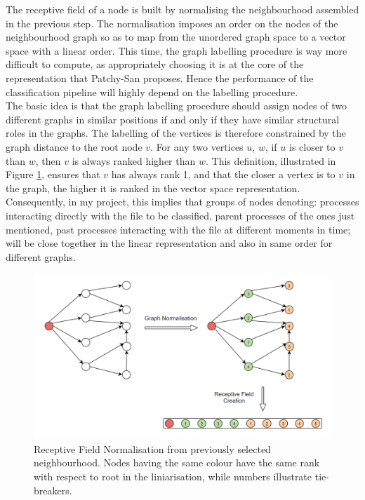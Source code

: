 The receptive field of a node is built by normalising the neighbourhood assembled in the previous step. The normalisation imposes an order on the nodes of the neighbourhood graph so as to map from the unordered graph space to a vector space with a linear order. This time, the graph labelling procedure is way more difficult to compute, as appropriately choosing it is at the core of the representation that Patchy-San proposes. Hence the performance of the classification pipeline will highly depend on the labelling procedure. \\

The basic idea is that the graph labelling procedure should assign nodes of two different graphs in similar positions if and only if they have similar structural roles in the graphs. The labelling of the vertices is therefore constrained by the graph distance to the root node $v$. For any two vertices $u$, $w$, if $u$ is closer to $v$ than $w$, then $v$ is
always ranked higher than $w$. This definition, illustrated in Figure \ref{normalisation}, ensures that $v$ has always rank 1, and that the closer a vertex is to $v$ in the graph, the higher it is ranked in the vector space representation. Consequently, in my project, this implies that groups of nodes denoting: processes interacting directly with the file to be classified, parent processes of the ones just mentioned, past processes interacting with the file at different moments in time; will be close together in the linear representation and also in same order for different graphs.

\begin{figure}[H]
  \centering
  \includegraphics[scale=0.45]{Images/normalisation.png}
  \caption{Receptive Field Normalisation from previously selected neighbourhood. Nodes having the same colour have the same rank with respect to root in the liniarisation, while numbers illustrate tie-breakers.}
  \label{normalisation}
\end{figure}

